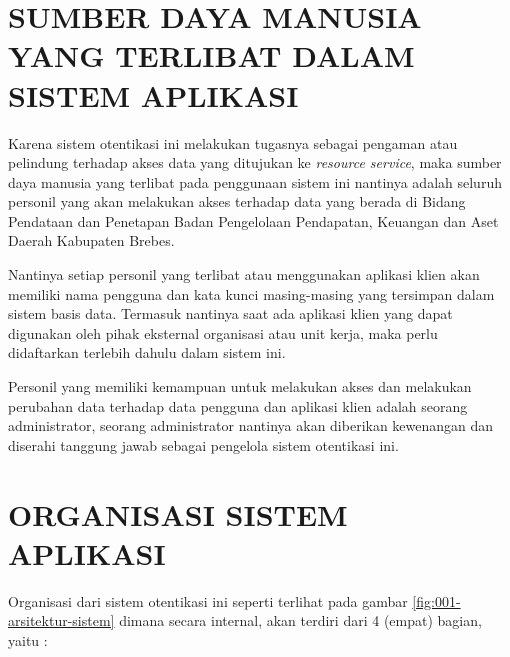 \documentclass[pdftex,12pt, oneside]{article}
\begin{document}
\section{SUMBER DAYA MANUSIA YANG TERLIBAT DALAM SISTEM APLIKASI}

Karena sistem otentikasi ini melakukan tugasnya sebagai pengaman atau pelindung terhadap akses data yang ditujukan ke \textit{resource service}, maka sumber daya manusia yang terlibat pada penggunaan sistem ini nantinya adalah seluruh personil yang akan melakukan akses terhadap data yang berada di Bidang Pendataan dan Penetapan Badan Pengelolaan Pendapatan, Keuangan dan Aset Daerah Kabupaten Brebes.

Nantinya setiap personil yang terlibat atau menggunakan aplikasi klien akan memiliki nama pengguna dan kata kunci masing-masing yang tersimpan dalam sistem basis data. Termasuk nantinya saat ada aplikasi klien yang dapat digunakan oleh pihak eksternal organisasi atau unit kerja, maka perlu didaftarkan terlebih dahulu dalam sistem ini. 

Personil yang memiliki kemampuan untuk melakukan akses dan melakukan perubahan data terhadap data pengguna dan aplikasi klien adalah seorang administrator, seorang administrator nantinya akan diberikan kewenangan dan diserahi tanggung jawab sebagai pengelola sistem otentikasi ini.

\section{ORGANISASI SISTEM APLIKASI}

Organisasi dari sistem otentikasi ini seperti terlihat pada gambar \ref{fig:001-arsitektur-sistem} dimana secara internal, akan terdiri dari 4 (empat) bagian, yaitu :
\end{document}
